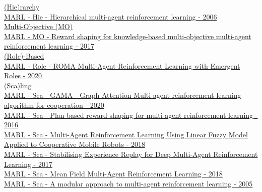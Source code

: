 \underline{(Hie)rarchy}
\\
\href{https://link.springer.com/article/10.1007/s10458-006-7035-4}{MARL - Hie - Hierarchical multi-agent reinforcement learning - 2006}
\\

\underline{Multi-Objective (MO)}
\\
\href{https://www.cambridge.org/core/journals/knowledge-engineering-review/article/reward-shaping-for-knowledgebased-multiobjective-multiagent-reinforcement-learning/75F1507F7CAC7C6625F87AE7CD344D52}{MARL - MO - Reward shaping for knowledge-based multi-objective multi-agent reinforcement learning - 2017}
\\

\underline{(Role)-Based}
\\
\href{http://proceedings.mlr.press/v119/wang20f.html}{MARL - Role - ROMA Multi-Agent Reinforcement Learning with Emergent Roles - 2020}
\\

\underline{(Sca)ling}
\\
\href{https://link.springer.com/article/10.1007/s10489-020-01755-8}{MARL - Sca - GAMA - Graph Attention Multi-agent reinforcement learning algorithm for cooperation - 2020}
\\
\href{https://www.cambridge.org/core/journals/knowledge-engineering-review/article/planbased-reward-shaping-for-multiagent-reinforcement-learning/B173D25B1006B755667616C3A3EB3BE5}{MARL - Sca - Plan-based reward shaping for multi-agent reinforcement learning - 2016}
\\
\href{https://www.mdpi.com/2073-8994/10/10/461}{MARL - Sca - Multi-Agent Reinforcement Learning Using Linear Fuzzy Model Applied to Cooperative Mobile Robots - 2018}
\\
\href{http://proceedings.mlr.press/v70/foerster17b.html}{MARL - Sca - Stabilising Experience Replay for Deep Multi-Agent Reinforcement Learning - 2017}
\\
\href{http://proceedings.mlr.press/v80/yang18d.html}{MARL - Sca - Mean Field Multi-Agent Reinforcement Learning - 2018}
\\
\href{https://link.springer.com/chapter/10.1007/3-540-62934-3_39}{MARL - Sca - A modular approach to multi-agent reinforcement learning - 2005}
\\

